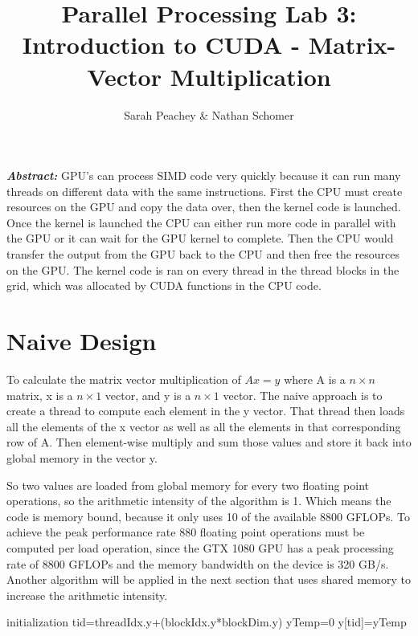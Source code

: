 \documentclass[12pt]{article}
\begin{document}
\title{Parallel Processing Lab 3: \\ Introduction to CUDA - Matrix-Vector
Multiplication}
\author{Sarah Peachey \& Nathan Schomer}
\maketitle


\textbf{\textit{Abstract:}} GPU's can process SIMD code very quickly because
it can run many threads on different data with the same instructions. First
the CPU must create resources on the GPU and copy the data over, then the
kernel code is launched. Once the kernel is launched the CPU can either run
more code in parallel with the GPU or it can wait for the GPU kernel to
complete. Then the CPU would transfer the output from the GPU back to the CPU 
and then free the resources on the GPU. The kernel code is ran on every
thread in the thread blocks in the grid, which was allocated by CUDA
functions in the CPU code.   
\newpage

\vspace{-1.5cm}
\section{Naive Design}
\vspace{-0.25cm}


\qquad To calculate the matrix vector multiplication of $Ax=y$ where A is a
$n \times n$ matrix, x is a $n \times 1$ vector, and y is a $n \times 1$
vector. The naive approach is to create a thread to compute each element in
the y vector. That thread then loads all the elements of the x vector as
well as all the elements in that corresponding row of A. Then element-wise
multiply and sum those values and store it back into global memory in the
vector y. 

So two values are loaded from global memory for every two floating
point operations, so the arithmetic intensity of the algorithm is 1. Which
means the code is memory bound, because it only uses 10 of the available 8800
GFLOPs. To achieve the peak
performance rate 880 floating point operations must be computed per load
operation, since the GTX 1080 GPU has a peak processing rate of 8800 GFLOPs and
the memory bandwidth on the device is 320 GB/s. Another algorithm will be
applied in the next section that uses shared memory to increase the
arithmetic intensity. 

\vspace{1cm}
\begin{algorithm}[H]
 	initialization\;
	tid=threadIdx.y+(blockIdx.y*blockDim.y)\;
	yTemp=0\;
	y[tid]=yTemp\; 
   	
\end{algorithm}
\end{document}
